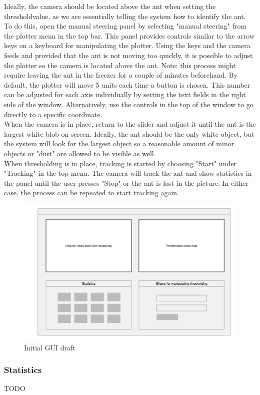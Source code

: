 Ideally, the camera should be located above the ant when setting the thresholdvalue, as we are essentially telling the system how to identify the ant. To do this, open the manual steering panel by selecting "manual steering" from the plotter menu in the top bar. This panel provides controls similar to the arrow keys on a keyboard for manipulating the plotter. Using the keys and the camera feeds and provided that the ant is not moving too quickly, it is possible to adjust the plotter so the camera is located above the ant. Note: this process might require leaving the ant in the freezer for a couple of minutes beforehand. By default, the plotter will move 5 units each time a button is chosen. This number can be adjusted for each axis individually by setting the text fields in the right side of the window. Alternatively, use the controls in the top of the window to go directly to a specific coordinate. \\

When the camera is in place, return to the slider and adjust it until the ant is the largest white blob on screen. Ideally, the ant should be the only white object, but the system will look for the largest object so a reasonable amount of minor objects or "dust" are allowed to be visible as well. \\

When thresholding is in place, tracking is started by choosing "Start" under "Tracking" in the top menu. The camera will track the ant and show statistics in the panel until the user presses "Stop" or the ant is lost in the picture. In either case, the process can be repeated to start tracking again. \\


\begin{figure}[!ht]
    \centering
    \includegraphics[scale = 0.3]{img/termes_gui.png}
    \caption{Initial GUI draft}
    \label{fig:gui}
\end{figure}

\subsubsection{Statistics} \mbox{}\par

TODO
